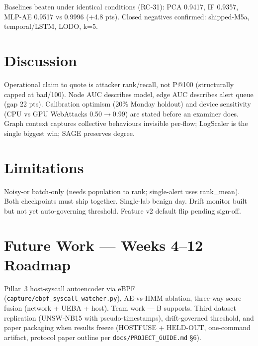 \documentclass[12pt,a4paper,oneside]{report}
\begin{document}
Baselines beaten under identical conditions (RC-31): PCA 0.9417, IF 0.9357, MLP-AE 0.9517 vs 0.9996 ($+$4.8 pts). Closed negatives confirmed: shipped-M5a, temporal/LSTM, LODO, k=5.

\section{Discussion}
Operational claim to quote is attacker rank/recall, not P@100 (structurally capped at bad/100). Node AUC describes model, edge AUC describes alert queue (gap 22 pts). Calibration optimism (20\% Monday holdout) and device sensitivity (CPU vs GPU WebAttacks 0.50$\rightarrow$0.99) are stated before an examiner does. Graph context captures collective behaviours invisible per-flow; LogScaler is the single biggest win; SAGE preserves degree.

\section{Limitations}
Noisy-or batch-only (needs population to rank; single-alert uses rank\_mean). Both checkpoints must ship together. Single-lab benign day. Drift monitor built but not yet auto-governing threshold. Feature v2 default flip pending sign-off.

\section{Future Work — Weeks 4--12 Roadmap}
Pillar~3 host-syscall autoencoder via eBPF (\texttt{capture/ebpf\_syscall\_watcher.py}), AE-vs-HMM ablation, three-way score fusion (network + UEBA + host). Team work — B supports. Third dataset replication (UNSW-NB15 with pseudo-timestamps), drift-governed threshold, and paper packaging when results freeze (HOSTFUSE + HELD-OUT, one-command artifact, protocol paper outline per \texttt{docs/PROJECT\_GUIDE.md} \S6).
\end{document}
